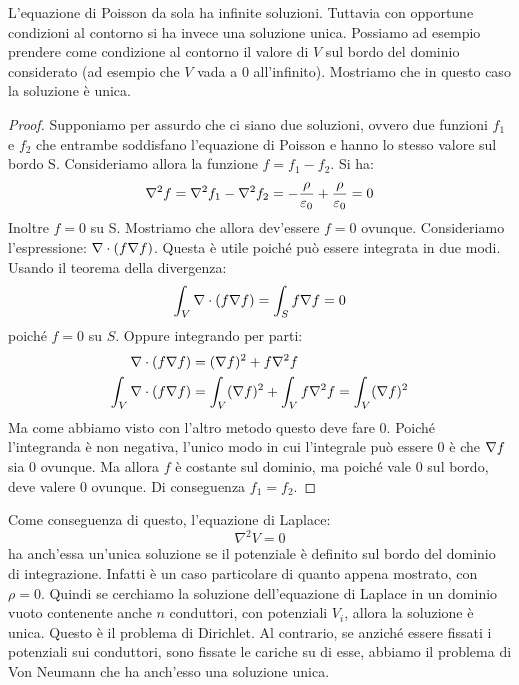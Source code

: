 L'equazione di Poisson da sola ha infinite soluzioni. Tuttavia con opportune condizioni al contorno si ha invece una soluzione unica. Possiamo ad esempio prendere come condizione al contorno il valore di $V$ sul bordo del dominio considerato (ad esempio che $V$ vada a 0 all'infinito). Mostriamo che in questo caso la soluzione è unica.
\begin{proof}
    Supponiamo per assurdo che ci siano due soluzioni, ovvero due funzioni $f_1$ e $f_2$ che entrambe soddisfano l'equazione di Poisson e hanno lo stesso valore sul bordo S. Consideriamo allora la funzione $f = f_1-f_2$. Si ha:
    \begin{equation}
        \nabla^2 f = \nabla^2 f_1 - \nabla^2 f_2 = - \frac{ \rho }{ \varepsilon_0 } + \frac{ \rho }{ \varepsilon_0 } = 0
    \end{equation}
    Inoltre $f=0$ su S. Mostriamo che allora dev'essere $f=0$ ovunque. Consideriamo l'espressione: $\nabla \cdot (f \nabla f)$. Questa è utile poiché può essere integrata in due modi. Usando il teorema della divergenza: 
    \begin{equation}
        \int_V \nabla \cdot (f \nabla f) = \int_S f \nabla f = 0
    \end{equation}
    poiché $f=0$ su $S$. Oppure integrando per parti:
    \begin{align}
        \nabla \cdot (f \nabla f) &= (\nabla f)^2 + f \nabla^2 f \\
        \int_V \nabla \cdot (f \nabla f) &= \int_V (\nabla f)^2 + \int_V f \nabla^2 f = \int_V (\nabla f)^2 
    \end{align}
    Ma come abbiamo visto con l'altro metodo questo deve fare 0. Poiché l'integranda è non negativa, l'unico modo in cui l'integrale può essere 0 è che $\nabla f$ sia 0 ovunque. Ma allora $f$ è costante sul dominio, ma poiché vale 0 sul bordo, deve valere 0 ovunque. Di conseguenza $f_1=f_2$.
\end{proof}
Come conseguenza di questo, l'equazione di Laplace:
\begin{equation}
    \nabla^2 V = 0
\end{equation}
ha anch'essa un'unica soluzione se il potenziale è definito sul bordo del dominio di integrazione. Infatti è un caso particolare di quanto appena mostrato, con $\rho = 0$. Quindi se cerchiamo la soluzione dell'equazione di Laplace in un dominio vuoto contenente anche $n$ conduttori, con potenziali $V_i$, allora la soluzione è unica. Questo è il problema di Dirichlet. Al contrario, se anziché essere fissati i potenziali sui conduttori, sono fissate le cariche su di esse, abbiamo il problema di Von Neumann che ha anch'esso una soluzione unica. 

